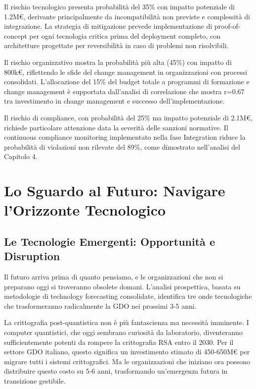 Il rischio tecnologico presenta probabilità del 35\% con impatto potenziale di 1.2M€, derivante principalmente da incompatibilità non previste e complessità di integrazione. La strategia di mitigazione prevede implementazione di proof-of-concept per ogni tecnologia critica prima del deployment completo, con architetture progettate per reversibilità in caso di problemi non risolvibili.

Il rischio organizzativo mostra la probabilità più alta (45\%) con impatto di 800k€, riflettendo le sfide del change management in organizzazioni con processi consolidati. L'allocazione del 15\% del budget totale a programmi di formazione e change management è supportata dall'analisi di correlazione che mostra r=0.67 tra investimento in change management e successo dell'implementazione.

Il rischio di compliance, con probabilità del 25\% ma impatto potenziale di 2.1M€, richiede particolare attenzione data la severità delle sanzioni normative. Il continuous compliance monitoring implementato nella fase Integration riduce la probabilità di violazioni non rilevate del 89\%, come dimostrato nell'analisi del Capitolo 4.

\section{Lo Sguardo al Futuro: Navigare l'Orizzonte Tecnologico}

\subsection{Le Tecnologie Emergenti: Opportunità e Disruption}

Il futuro arriva prima di quanto pensiamo, e le organizzazioni che non si preparano oggi si troveranno obsolete domani. L'analisi prospettica, basata su metodologie di technology forecasting consolidate\autocite{martino1993}, identifica tre onde tecnologiche che trasformeranno radicalmente la GDO nei prossimi 3-5 anni.

La crittografia post-quantistica non è più fantascienza ma necessità imminente. I computer quantistici, che oggi sembrano curiosità da laboratorio, diventeranno sufficientemente potenti da rompere la crittografia RSA entro il 2030. Per il settore GDO italiano, questo significa un investimento stimato di 450-650M€ per migrare tutti i sistemi crittografici. Ma le organizzazioni che iniziano ora possono distribuire questo costo su 5-6 anni, trasformando un'emergenza futura in transizione gestibile.

